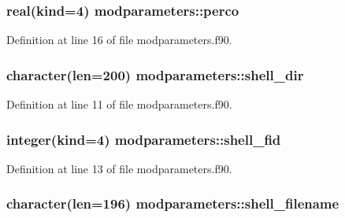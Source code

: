 \hypertarget{classmodparameters_a555c497cb7980e89a34876df62f2b22b}{
\subsubsection[{perco}]{\setlength{\rightskip}{0pt plus 5cm}real(kind=4) modparameters\-::perco}}\label{classmodparameters_a555c497cb7980e89a34876df62f2b22b}


Definition at line 16 of file modparameters.\-f90.

\hypertarget{classmodparameters_adb57a3540b1d0caa308f50ac8f56d99f}{
\subsubsection[{shell\-\_\-dir}]{\setlength{\rightskip}{0pt plus 5cm}character(len=200) modparameters\-::shell\-\_\-dir}}\label{classmodparameters_adb57a3540b1d0caa308f50ac8f56d99f}


Definition at line 11 of file modparameters.\-f90.

\hypertarget{classmodparameters_ab8116a893043284dd7f4c7d54d179af6}{
\subsubsection[{shell\-\_\-fid}]{\setlength{\rightskip}{0pt plus 5cm}integer(kind=4) modparameters\-::shell\-\_\-fid}}\label{classmodparameters_ab8116a893043284dd7f4c7d54d179af6}


Definition at line 13 of file modparameters.\-f90.

\hypertarget{classmodparameters_a6dab5a077dd6af2175b0d59dd11f171a}{
\subsubsection[{shell\-\_\-filename}]{\setlength{\rightskip}{0pt plus 5cm}character(len=196) modparameters\-::shell\-\_\-filename}}\label{classmodparameters_a6dab5a077dd6af2175b0d59dd11f171a}


